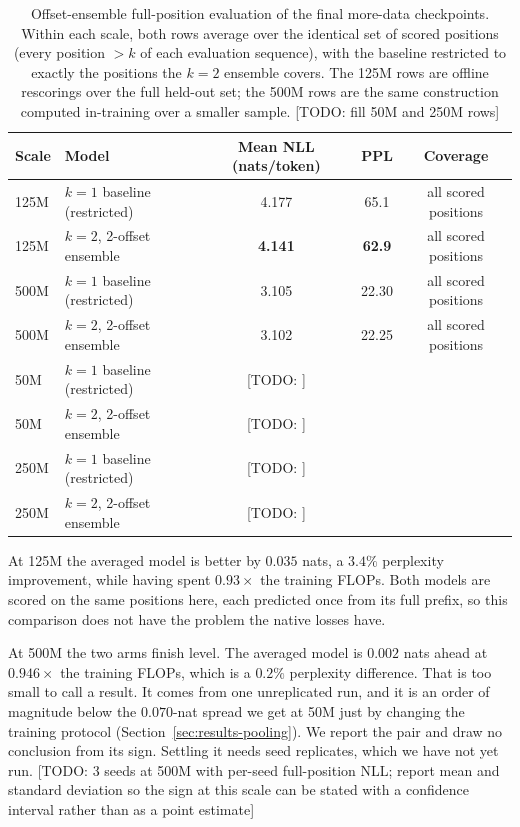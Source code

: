 \documentclass[11pt]{article}
\newcommand{\good}[1]{\textcolor{okgreen}{#1}}
\newcommand{\todo}[1]{\textcolor{warnred}{[TODO: #1]}}
\begin{document}
\begin{table}[h]
\centering
\caption{Offset-ensemble full-position evaluation of the final more-data
checkpoints. Within each scale, both rows average over the identical set of
scored positions (every position $> k$ of each evaluation sequence), with the
baseline restricted to exactly the positions the $k{=}2$ ensemble covers. The
125M rows are offline rescorings over the full held-out set; the 500M rows are
the same construction computed in-training over a smaller sample.
\todo{fill 50M and 250M rows}}
\label{tab:fullpos}
\vspace{0.4em}
\begin{tabular}{llccc}
\toprule
Scale & Model & Mean NLL (nats/token) & PPL & Coverage \\
\midrule
125M & $k{=}1$ baseline (restricted) & 4.177 & 65.1 & all scored positions \\
125M & $k{=}2$, 2-offset ensemble & \good{\textbf{4.141}} & \good{\textbf{62.9}} & all scored positions \\
\midrule
500M & $k{=}1$ baseline (restricted) & 3.105 & 22.30 & all scored positions \\
500M & $k{=}2$, 2-offset ensemble & \good{3.102} & \good{22.25} & all scored positions \\
\midrule
50M & $k{=}1$ baseline (restricted) & \todo{} & & \\
50M & $k{=}2$, 2-offset ensemble & \todo{} & & \\
\midrule
250M & $k{=}1$ baseline (restricted) & \todo{} & & \\
250M & $k{=}2$, 2-offset ensemble & \todo{} & & \\
\bottomrule
\end{tabular}
\end{table}

At 125M the averaged model is better by $0.035$ nats, a \good{$3.4\%$
perplexity improvement}, while having spent $0.93\times$ the training FLOPs.
Both models are scored on the same positions here, each predicted once from
its full prefix, so this comparison does not have the problem the native
losses have.

At 500M the two arms finish level. The averaged model is $0.002$ nats ahead at
$0.946\times$ the training FLOPs, which is a $0.2\%$ perplexity difference.
That is too small to call a result. It comes from one unreplicated run, and it
is an order of magnitude below the $0.070$-nat spread we get at 50M just by
changing the training protocol (Section~\ref{sec:results-pooling}). We report
the pair and draw no conclusion from its sign. Settling it needs seed
replicates, which we have not yet run.
\todo{3 seeds at 500M with per-seed full-position NLL; report mean and
standard deviation so the sign at this scale can be stated with a confidence
interval rather than as a point estimate}
\end{document}
